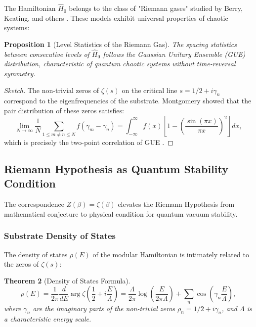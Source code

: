 \documentclass[11pt, a4paper]{article}
\theoremstyle{plain}
\newtheorem{theorem}{Theorem}[section]
\newtheorem{proposition}[theorem]{Proposition}
\theoremstyle{definition}
\begin{document}
The Hamiltonian $\hat{H}_0$ belongs to the class of "Riemann gases" studied by Berry, Keating, and others \cite{Berry1999}. These models exhibit universal properties of chaotic systems:

\begin{proposition}[Level Statistics of the Riemann Gas]
The spacing statistics between consecutive levels of $\hat{H}_0$ follows the Gaussian Unitary Ensemble (GUE) distribution, characteristic of quantum chaotic systems without time-reversal symmetry.
\end{proposition}

\begin{proof}[Sketch]
The non-trivial zeros of $\zeta(s)$ on the critical line $s = 1/2 + i\gamma_n$ correspond to the eigenfrequencies of the substrate. Montgomery showed that the pair distribution of these zeros satisfies:
\begin{equation}
\lim_{N \to \infty} \frac{1}{N} \sum_{1 \leq m \neq n \leq N} f(\gamma_m - \gamma_n) = \int_{-\infty}^\infty f(x) \left[1 - \left(\frac{\sin(\pi x)}{\pi x}\right)^2\right] dx,
\end{equation}
which is precisely the two-point correlation of GUE \cite{Montgomery1973}.
\end{proof}

\subsection{Riemann Hypothesis as Quantum Stability Condition}

The correspondence $Z(\beta) = \zeta(\beta)$ elevates the Riemann Hypothesis from mathematical conjecture to physical condition for quantum vacuum stability.

\subsubsection{Substrate Density of States}

The density of states $\rho(E)$ of the modular Hamiltonian is intimately related to the zeros of $\zeta(s)$:

\begin{theorem}[Density of States Formula]
\begin{equation}
\rho(E) = \frac{1}{2\pi} \frac{d}{dE} \arg \zeta\left(\frac{1}{2} + i\frac{E}{\Lambda}\right) = \frac{\Lambda}{2\pi} \log\left(\frac{E}{2\pi\Lambda}\right) + \sum_n \cos\left(\gamma_n \frac{E}{\Lambda}\right),
\label{eq:density_of_states}
\end{equation}
where $\gamma_n$ are the imaginary parts of the non-trivial zeros $\rho_n = 1/2 + i\gamma_n$, and $\Lambda$ is a characteristic energy scale.
\end{theorem}
\end{document}
